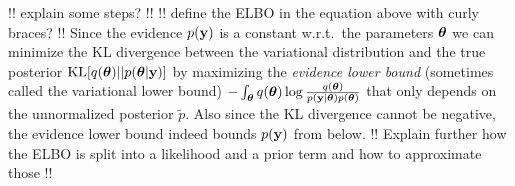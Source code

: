 \documentclass[../thesis.tex]{subfiles}
\begin{document}
!! explain some steps? !!
!! define the ELBO in the equation above with curly braces? !!
Since the evidence $p(\boldsymbol{\mathbf{y}})$ is a constant w.r.t.\ the parameters $\boldsymbol{\mathbf{\theta}}$ we can minimize the KL divergence between the variational distribution and the true posterior $\operatorname{KL}[q(\boldsymbol{\mathbf{\theta}})||p(\boldsymbol{\mathbf{\theta}} | \boldsymbol{\mathbf{y}})]$ by maximizing the \textit{evidence lower bound} (sometimes called the variational lower bound) $-\int_{\boldsymbol{\mathbf{\theta}}} q(\boldsymbol{\mathbf{\theta}}) \log \frac{q(\boldsymbol{\mathbf{\theta}})}{p(\boldsymbol{\mathbf{y}} | \boldsymbol{\mathbf{\theta}}) p(\boldsymbol{\mathbf{\theta}})}$ that only depends on the unnormalized posterior $\tilde{p}$. Also since the KL divergence cannot be negative, the evidence lower bound indeed bounds $p(\boldsymbol{\mathbf{y}})$ from below.
!! Explain further how the ELBO is split into a likelihood and a prior term and how to approximate those !!
\end{document}
